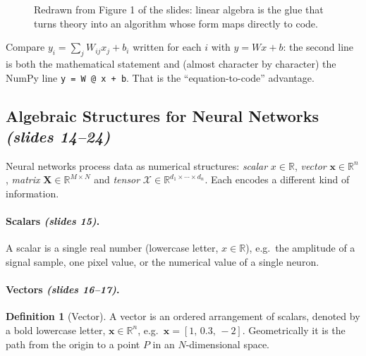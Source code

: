 \documentclass[11pt,a4paper]{article}
\newcommand{\R}{\mathbb{R}}
\newcommand{\slides}[1]{\texorpdfstring{\emph{(slides #1)}}{(slides #1)}}
\theoremstyle{definition}
\newtheorem{definition}{Definition}[section]
\theoremstyle{plain}
\begin{document}
\begin{figure}[ht]
\centering
{}
\caption{Redrawn from Figure 1 of the slides: linear algebra is the glue that turns theory into an algorithm whose form maps directly to code.}
\end{figure}

\begin{intuition}
Compare $y_i=\sum_j W_{ij}x_j+b_i$ written for each $i$ with $y=Wx+b$: the second line is both the mathematical statement and (almost character by character) the NumPy line \texttt{y = W @ x + b}. That is the ``equation-to-code'' advantage.
\end{intuition}

\subsection{Algebraic Structures for Neural Networks \slides{14--24}}

Neural networks process data as numerical structures: \emph{scalar} $x\in\R$, \emph{vector} $\mathbf x\in\R^n$, \emph{matrix} $\mathbf X\in\R^{M\times N}$ and \emph{tensor} $\mathcal X\in\R^{d_1\times\cdots\times d_n}$. Each encodes a different kind of information.

\paragraph{Scalars \slides{15}.} A scalar is a single real number (lowercase letter, $x\in\R$), e.g.\ the amplitude of a signal sample, one pixel value, or the numerical value of a single neuron.

\paragraph{Vectors \slides{16--17}.}
\begin{definition}[Vector]
A vector is an ordered arrangement of scalars, denoted by a bold lowercase letter, $\mathbf x\in\R^n$, e.g.\ $\mathbf x=[1,\,0.3,\,-2]$. Geometrically it is the path from the origin to a point $P$ in an $N$-dimensional space.
\end{definition}
\end{document}
